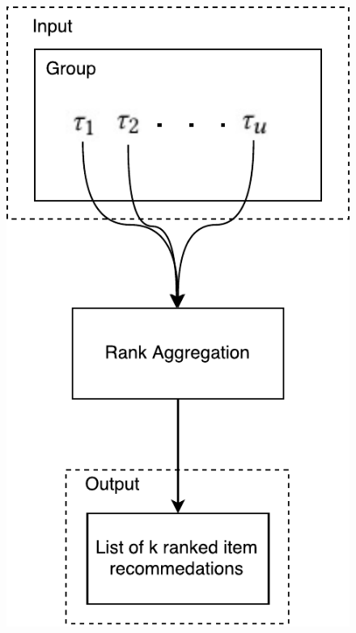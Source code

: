 \begin{frame}
\begin{columns}
\begin{column}{0.5\textwidth}
\begin{figure}
			\includegraphics[scale=.5]{graphics/setuptransposed}
		\end{figure}
	\end{column}
\end{columns}
\end{frame}

%
